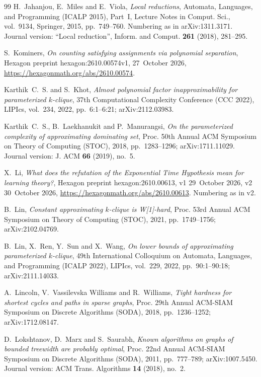 \documentclass[10pt]{amsart}
\theoremstyle{plain}
\theoremstyle{definition}
\theoremstyle{remark}
\numberwithin{equation}{section}
\begin{document}
\begin{thebibliography}{99}
H.~Jahanjou, E.~Miles and E.~Viola, \emph{Local reductions}, Automata, Languages, and Programming
(ICALP 2015), Part~I, Lecture Notes in Comput. Sci., vol.~9134, Springer, 2015, pp.~749--760.
Numbering as in arXiv:1311.3171. Journal version: ``Local reduction'', Inform. and Comput.
\textbf{261} (2018), 281--295.

S.~Kominers, \emph{On counting satisfying assignments via polynomial separation}, Hexagon preprint
hexagon:2610.00574v1, 27~October 2026, \url{https://hexagonmath.org/abs/2610.00574}.

Karthik~C.~S. and S.~Khot, \emph{Almost polynomial factor inapproximability for parameterized
$k$-clique}, 37th Computational Complexity Conference (CCC 2022), LIPIcs, vol.~234, 2022,
pp.~6:1--6:21; arXiv:2112.03983.

Karthik~C.~S., B.~Laekhanukit and P.~Manurangsi, \emph{On the parameterized complexity of
approximating dominating set}, Proc. 50th Annual ACM Symposium on Theory of Computing (STOC), 2018,
pp.~1283--1296; arXiv:1711.11029. Journal version: J. ACM \textbf{66} (2019), no.~5.

X.~Li, \emph{What does the refutation of the {E}xponential {T}ime {H}ypothesis mean for learning
theory?}, Hexagon preprint hexagon:2610.00613, v1 29~October 2026, v2 30~October 2026,
\url{https://hexagonmath.org/abs/2610.00613}. Numbering as in v2.

B.~Lin, \emph{Constant approximating $k$-clique is {W[1]}-hard}, Proc. 53rd Annual ACM Symposium on
Theory of Computing (STOC), 2021, pp.~1749--1756; arXiv:2102.04769.

B.~Lin, X.~Ren, Y.~Sun and X.~Wang, \emph{On lower bounds of approximating parameterized
$k$-clique}, 49th International Colloquium on Automata, Languages, and Programming (ICALP 2022),
LIPIcs, vol.~229, 2022, pp.~90:1--90:18; arXiv:2111.14033.

A.~Lincoln, V.~Vassilevska Williams and R.~Williams, \emph{Tight hardness for shortest cycles and
paths in sparse graphs}, Proc. 29th Annual ACM-SIAM Symposium on Discrete Algorithms (SODA), 2018,
pp.~1236--1252; arXiv:1712.08147.

D.~Lokshtanov, D.~Marx and S.~Saurabh, \emph{Known algorithms on graphs of bounded treewidth are
probably optimal}, Proc. 22nd Annual ACM-SIAM Symposium on Discrete Algorithms (SODA), 2011,
pp.~777--789; arXiv:1007.5450. Journal version: ACM Trans. Algorithms \textbf{14} (2018), no.~2.


\end{thebibliography}
\end{document}
